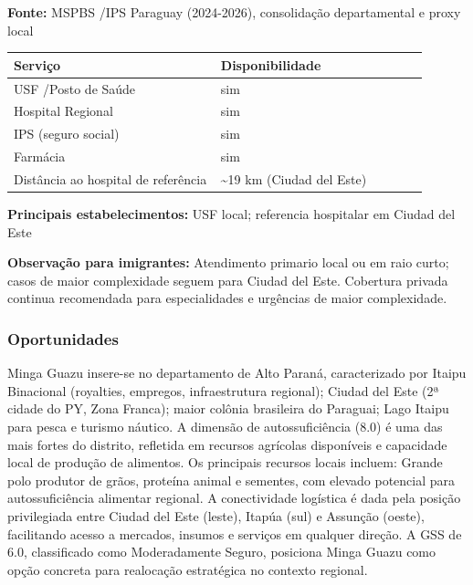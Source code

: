 \textbf{Fonte:} MSPBS /\allowbreak  IPS Paraguay (2024-2026), consolidação
departamental e proxy local

{\def\LTcaptype{none} %
\begin{longtable}{@{}>{\raggedright\arraybackslash}p{0.45\linewidth} >{\raggedright\arraybackslash}p{0.45\linewidth}@{}}
\toprule\noalign{}
Serviço & Disponibilidade \\
\midrule\noalign{}
\endhead
\bottomrule\noalign{}
\endlastfoot
USF /\allowbreak  Posto de Saúde & sim \\
Hospital Regional & sim \\
IPS (seguro social) & sim \\
Farmácia & sim \\
Distância ao hospital de referência & \textasciitilde19 km (Ciudad del
Este) \\
\end{longtable}
}

\textbf{Principais estabelecimentos:} USF local; referencia hospitalar
em Ciudad del Este

\textbf{Observação para imigrantes:} Atendimento primario local ou em
raio curto; casos de maior complexidade seguem para Ciudad del Este.
Cobertura privada continua recomendada para especialidades e urgências
de maior complexidade.
\newpage

\subsubsection*{Oportunidades}\label{oport-minga-guazu-1011}
Minga Guazu insere-se no departamento de Alto Paraná, caracterizado por Itaipu Binacional (royalties, empregos, infraestrutura regional); Ciudad del Este (2ª cidade do PY, Zona Franca); maior colônia brasileira do Paraguai; Lago Itaipu para pesca e turismo náutico. A dimensão de autossuficiência (8.0) é uma das mais fortes do distrito, refletida em recursos agrícolas disponíveis e capacidade local de produção de alimentos. Os principais recursos locais incluem: Grande polo produtor de grãos, proteína animal e sementes, com elevado potencial para autossuficiência alimentar regional. A conectividade logística é dada pela posição privilegiada entre Ciudad del Este (leste), Itapúa (sul) e Assunção (oeste), facilitando acesso a mercados, insumos e serviços em qualquer direção. A GSS de 6.0, classificado como Moderadamente Seguro, posiciona Minga Guazu como opção concreta para realocação estratégica no contexto regional.

